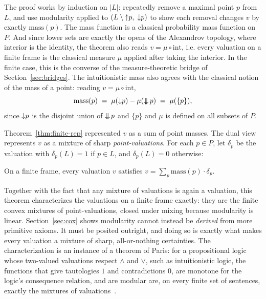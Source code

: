 The proof works by induction on $|L|$: repeatedly remove a maximal
point $p$ from $L$, and use modularity applied to
$(L \setminus {\uparrow} p,\; {\downarrow} p)$ to show each removal
changes $v$ by exactly $\mathrm{mass}(p)$.
The mass function is a classical probability mass function on
$P$.  And since lower sets are
exactly the opens of the Alexandrov topology, where interior is the
identity, the theorem also reads $v = \mu \circ \mathrm{int}$, i.e.
every valuation on a
finite frame is the classical measure $\mu$ applied after
taking the interior.
In the finite case, this is the converse of
the measure-theoretic bridge of Section~\ref{sec:bridges}.
The intuitionistic mass also agrees with the classical notion of the
mass of a point: reading $v = \mu \circ \mathrm{int}$,
\[
  \mathrm{mass}(p) \;=\; \mu({\downarrow} p) - \mu(\mathop{\downarrow\!\!\downarrow} p)
  \;=\; \mu(\{p\}),
\]
since ${\downarrow} p$ is the disjoint union of $\mathop{\downarrow\!\!\downarrow} p$ and $\{p\}$ and
$\mu$ is defined on all subsets of $P$.

Theorem~\ref{thm:finite-rep} represented $v$ as a sum of point masses.
The dual view
represents $v$ as a mixture of sharp
\emph{point-valuations}.  For each $p \in P$, let
$\delta_p$ be the valuation with $\delta_p(L) = 1$ if $p \in L$, and
$\delta_p(L) = 0$ otherwise:

\begin{theorem}
\label{thm:mixture}
On a finite frame, every valuation $v$ satisfies
$v = \sum_p \mathrm{mass}(p)\cdot\delta_p$.
\end{theorem}

\noindent
Together with the fact that any mixture of valuations is again a
valuation, this theorem characterizes the
valuations on a finite frame exactly: they are the finite convex
mixtures of point-valuations, closed under mixing because modularity
is linear.  Section~\ref{sec:cox} shows modularity cannot instead be
\emph{derived} from more primitive axioms.  It must be posited
outright, and doing so is exactly what makes every valuation a
mixture of sharp, all-or-nothing certainties. The characterization is an
instance of a theorem of Paris: for a propositional logic whose
two-valued valuations respect $\wedge$ and $\vee$, such as intuitionistic
logic, the functions that give tautologies $1$ and contradictions $0$,
are monotone for the logic's consequence relation, and are modular are,
on every finite set of sentences, exactly the mixtures of
valuations~\cite{paris2001}.

